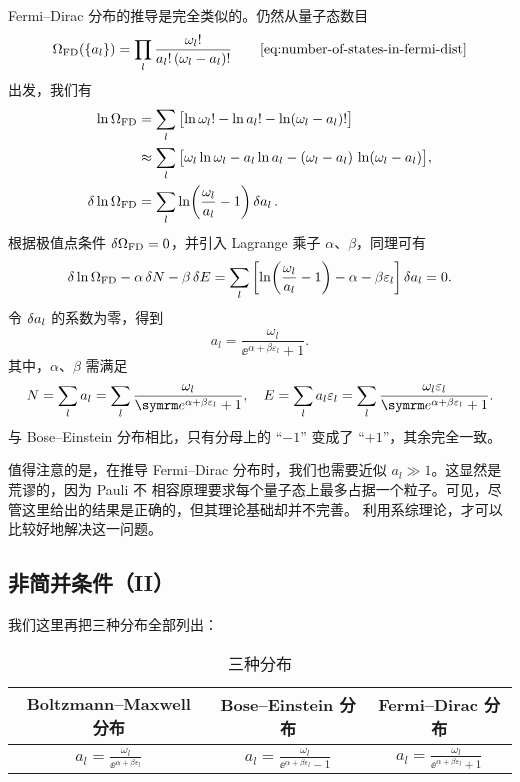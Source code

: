 Fermi--Dirac 分布的推导是完全类似的。仍然从量子态数目
\begin{equation}
  \Omega_\text{FD}(\qty{a_l}) = \prod_l \frac{\omega_l!}{a_l! \, \qty(\omega_l-a_l)!}
  \tag*{\eqref{eq:number-of-states-in-fermi-dist}}
\end{equation}
出发，我们有
\begin{align}
  \ln\Omega_\text{FD}
  &=       \sum_l \qty\big[\ln\omega_l! - \ln a_l! - \ln(\omega_l-a_l)!] \notag \\
  &\approx \sum_l \qty\big[\omega_l\ln\omega_l - a_l\ln a_l
                           - (\omega_l-a_l) \, \ln(\omega_l-a_l)], \\
  \var{\ln\Omega_\text{FD}}
  &= \sum_l \ln(\frac{\omega_l}{a_l}-1) \var{a_l}.
\end{align}
根据极值点条件 $\var{\Omega_\text{FD}}=0$，并引入 Lagrange 乘子 $\alpha$、$\beta$，同理可有
\begin{equation}
  \var{\ln\Omega_\text{FD}} - \alpha\var{N} - \beta\var{E}
  = \sum_l \qty[\ln(\frac{\omega_l}{a_l}-1) - \alpha - \beta\varepsilon_l] \var{a_l} = 0.
\end{equation}
令 $\var{a_l}$ 的系数为零，得到 
\begin{equation}
  a_l = \frac{\omega_l}{\ee^{\alpha+\beta\varepsilon_l}+1}.
\end{equation}
其中，$\alpha$、$\beta$ 需满足
\begin{equation}
  N = \sum_l a_l = \sum_l \frac{\omega_l}{\ee^{\alpha+\beta\varepsilon_l}+1} \qc
  E = \sum_l a_l \varepsilon_l = \sum_l \frac{\omega_l\varepsilon_l}%
                                        {\ee^{\alpha+\beta\varepsilon_l}+1}.
\end{equation}
与 Bose--Einstein 分布相比，只有分母上的 “$-1$” 变成了 “$+1$”，其余完全一致。

值得注意的是，在推导 Fermi--Dirac 分布时，我们也需要近似 $a_l \gg 1$。这显然是荒谬的，因为 Pauli 不
相容原理要求每个量子态上最多占据一个粒子。可见，尽管这里给出的结果是正确的，但其理论基础却并不完善。
利用系综理论，才可以比较好地解决这一问题。

\subsection{非简并条件（II）}

我们这里再把三种分布全部列出：

\begin{table}[ht]
  \centering
  \caption{三种分布}
  \begin{tabular}{ccc}
    \toprule
      Boltzmann--Maxwell 分布 & Bose--Einstein 分布 & Fermi--Dirac 分布 \\
    \midrule \addlinespace[1.2ex]
      $\displaystyle a_l = \frac{\omega_l}{\ee^{\alpha+\beta\varepsilon_l}}$   &
      $\displaystyle a_l = \frac{\omega_l}{\ee^{\alpha+\beta\varepsilon_l}-1}$ &
      $\displaystyle a_l = \frac{\omega_l}{\ee^{\alpha+\beta\varepsilon_l}+1}$ \\[1.5ex]
    \bottomrule
  \end{tabular}
\end{table}

